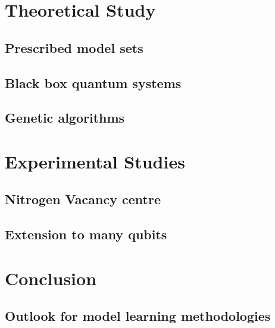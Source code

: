 \part{Theoretical Study}\label{part:theoretical_study}
    \chapter{Prescribed model sets}\label{chapter:lattices}
        
    \chapter{Black box quantum systems}\label{chapter:black_box}
        
    \chapter{Genetic algorithms}\label{chapter:ga}
        

\part{Experimental Studies}\label{part:experimental_study}
    \chapter{Nitrogen Vacancy centre}\label{chapter:nv}
        
    \chapter{Extension to many qubits}\label{chapter:many_qubits}
        
    
\part{Conclusion}\label{part:conclusion}
    \chapter{Outlook for model learning methodologies}\label{chapter:outlook}
        



